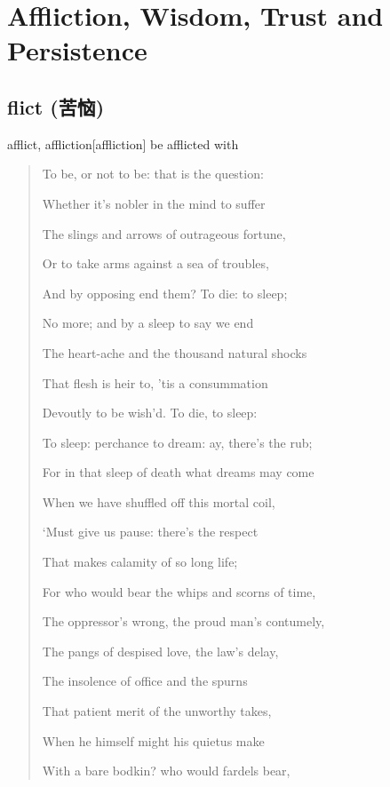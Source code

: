 \chapter{Affliction, Wisdom, Trust and Persistence}

\section{flict (苦恼)}

\begin{DefWord}{afflict, affliction}[affliction]
    be afflicted with
\end{DefWord}

\begin{quotation}
    To be, or not to be: that is the question:

    Whether it’s nobler in the mind to suffer

    The slings and arrows of outrageous fortune,

    Or to take arms against a sea of troubles,

    And by opposing end them? To die: to sleep;

    No more; and by a sleep to say we end

    The heart-ache and the thousand natural shocks

    That flesh is heir to, 'tis a consummation

    Devoutly to be wish'd. To die, to sleep:

    To sleep: perchance to dream: ay, there's the rub;

    For in that sleep of death what dreams may come

    When we have shuffled off this mortal coil,

    `Must give us pause: there's the respect

    That makes calamity of so long life;

    For who would bear the whips and scorns of time,

    The oppressor's wrong, the proud man's contumely,

    The pangs of despised love, the law's delay,

    The insolence of office and the spurns

    That patient merit of the unworthy takes,

    When he himself might his quietus make

    With a bare bodkin? who would fardels bear,


\end{quotation}
